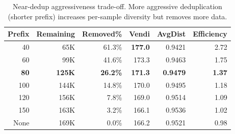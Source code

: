 \begin{table}[t]
\centering
\caption{Near-dedup aggressiveness trade-off. More aggressive deduplication (shorter prefix) increases per-sample diversity but removes more data.}
\label{tab:dedup}
\small
\begin{tabular}{rrrrrr}
\toprule
\textbf{Prefix} & \textbf{Remaining} & \textbf{Removed\%} & \textbf{Vendi} & \textbf{AvgDist} & \textbf{Efficiency} \\
\midrule
40 & 65K & 61.3\% & \textbf{177.0} & 0.9421 & 2.72 \\
60 & 99K & 41.6\% & 173.3 & 0.9463 & 1.75 \\
\textbf{80} & \textbf{125K} & \textbf{26.2\%} & \textbf{171.3} & \textbf{0.9479} & \textbf{1.37} \\
100 & 144K & 14.8\% & 170.0 & 0.9495 & 1.18 \\
120 & 156K & 7.8\% & 169.0 & 0.9514 & 1.09 \\
150 & 163K & 3.2\% & 166.1 & 0.9536 & 1.02 \\
None & 169K & 0.0\% & 166.2 & 0.9521 & 0.98 \\
\bottomrule
\end{tabular}
\end{table}
